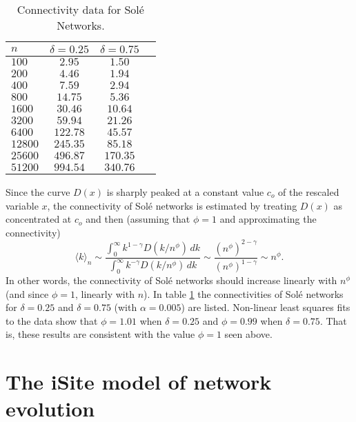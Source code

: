 \documentclass[12pt]{iopart}
\begin{document}
\begin{table}[t!]
\centering
\caption{Connectivity data for Sol\'e Networks.}
      \begin{tabular}{lccc}
        \hline
       $n$    &  $\delta=0.25$  & $\delta = 0.75$\\ \hline
        $100$ & $2.95$ & $1.50$ \\
        $200$ & $4.46$ & $1.94$ \\
        $400$ & $7.59$ & $2.94$ \\
        $800$ & $14.75$ & $5.36$ \\
        $1600$ & $30.46$ & $10.64$ \\
        $3200$ & $59.94$ & $21.26$ \\
        $6400$ & $122.78$ & $45.57$ \\
        $12800$ & $245.35$ & $85.18$ \\
      $25600$ & $496.87$ & $170.35$ \\
      $51200$ & $994.54$ & $340.76$ \\ \hline
      \end{tabular}
\label{tableSole}
\end{table}


Since the curve $D(x)$ is sharply peaked at a constant value $c_o$ of the
rescaled variable $x$, the connectivity of Sol\'e networks is estimated by treating
$D(x)$ as concentrated at $c_o$ and then (assuming that $\phi=1$ and approximating
the connectivity)
\begin{equation}
\langle k \rangle_n \sim
\frac{\int_0^\infty k^{1-\gamma} D(k/n^\phi)\, dk}{\int_0^\infty k^{-\gamma} D(k/n^\phi)\, dk}
\sim \frac{(n^{\phi})^{2-\gamma}}{(n^\phi)^{1-\gamma}} \sim n^\phi .
\end{equation}
In other words, the connectivity of Sol\'e networks should increase linearly with
$n^\phi$ (and since $\phi=1$, linearly with $n$).  In table \ref{tableSole} the 
connectivities of Sol\'e networks for $\delta=0.25$ and $\delta=0.75$
(with $\alpha=0.005$) are listed.  Non-linear least squares fits to the data show that
$\phi=1.01$ when $\delta=0.25$ and $\phi=0.99$ when $\delta=0.75$.  That is, these
results are consistent with the value $\phi=1$ seen above.  





\section{The iSite model of network evolution}
\end{document}
